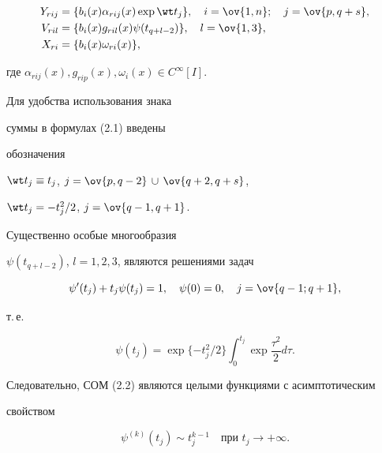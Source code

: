 \begin{equation} 


\begin{split} 


Y_{rij}&=\{b_i(x)\alpha_{rij}(x)\exp\wt t_j\},\quad 


i=\ov{1,n};\quad j=\ov{p,q+s},\\ 


% 


V_{ril}&=\{b_i(x)g_{ril}(x)\psi(t_{q+l-2})\},\quad l=\ov{1,3}, \\ 


% 


X_{ri}&=\{b_i(x)\omega_{ri}(x)\}, 


\end{split} 


\end{equation} 


где $\alpha_{rij}(x),g_{rip}(x),\omega_i(x)\in C^\infty[I]$. 


Для удобства использования знака 


суммы в формулах (2.1) введены 


обозначения 


$\wt t_j\equiv t_j$, $j=\ov{p,q-2}\,\cup\,\ov{q+2,q+s}$, 


$\wt t_j=-t^2_j/2$, $j=\ov{q-1,q+1}$. 


Существенно особые многообразия 


$\psi(t_{q+l-2})$, $l=1,2,3$, являются решениями задач 


$$ 


\psi'(t_j)+t_j\psi(t_j)=1,\quad 


\psi(0)=0,\quad j=\ov{q-1;q+1}, 


$$ 


т.\,е. 


\begin{equation} 


\psi(t_j)=\exp\{-t^2_j/2\}\int^{t_j}_0\exp\frac{\tau^2}{2}d\tau. 


\end{equation} 


Следовательно, СОМ (2.2) являются целыми функциями с асимптотическим 


свойством 


$$ 


\psi^{(k)}(t_j)\sim t^{k-1}_j\quad 


\text{при }t_j\to+\infty. 


$$ 



